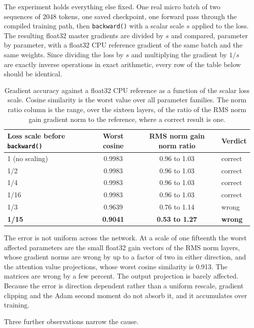 \documentclass[11pt,a4paper]{article}
\newcommand{\code}[1]{\texttt{\small #1}}
\begin{document}
The experiment holds everything else fixed. One real micro batch of two sequences
of 2048 tokens, one saved checkpoint, one forward pass through the compiled
training path, then \code{backward()} with a scalar scale $s$ applied to the loss.
The resulting float32 master gradients are divided by $s$ and compared, parameter
by parameter, with a float32 CPU reference gradient of the same batch and the same
weights. Since dividing the loss by $s$ and multiplying the gradient by $1/s$ are
exactly inverse operations in exact arithmetic, every row of the table below
should be identical.

\begin{table}[h]
\centering
\caption{Gradient accuracy against a float32 CPU reference as a function of the
scalar loss scale. Cosine similarity is the worst value over all parameter
families. The norm ratio column is the range, over the sixteen layers, of the
ratio of the RMS norm gain gradient norm to the reference, where a correct result
is one.}
\begin{tabular}{@{}lccl@{}}
\toprule
Loss scale before \code{backward()} & Worst cosine & RMS norm gain norm ratio & Verdict \\
\midrule
1 (no scaling)   & 0.9983 & 0.96 to 1.03 & correct \\
1/2              & 0.9983 & 0.96 to 1.03 & correct \\
1/4              & 0.9983 & 0.96 to 1.03 & correct \\
1/16             & 0.9983 & 0.96 to 1.03 & correct \\
1/3              & 0.9639 & 0.76 to 1.14 & wrong \\
\textbf{1/15}    & \textbf{0.9041} & \textbf{0.53 to 1.27} & \textbf{wrong} \\
\bottomrule
\end{tabular}
\end{table}

The error is not uniform across the network. At a scale of one fifteenth the
worst affected parameters are the small float32 gain vectors of the RMS norm
layers, whose gradient norms are wrong by up to a factor of two in either
direction, and the attention value projections, whose worst cosine similarity is
0.913. The matrices are wrong by a few percent. The output projection is barely
affected. Because the error is direction dependent rather than a uniform rescale,
gradient clipping and the Adam second moment do not absorb it, and it accumulates
over training.

Three further observations narrow the cause.
\end{document}
